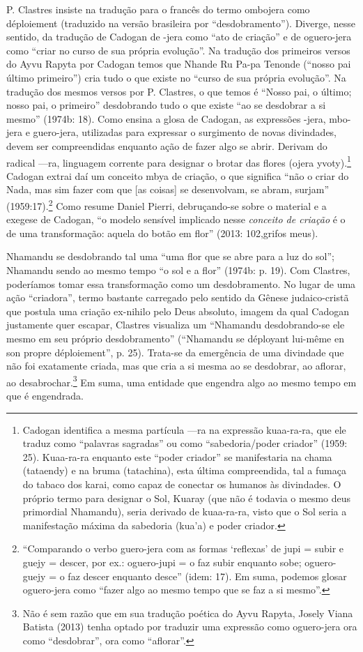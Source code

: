 P. Clastres insiste na tradução para o francês do termo ombojera como
déploiement (traduzido na versão brasileira por ``desdobramento'').
Diverge, nesse sentido, da tradução de Cadogan de -jera como ``ato de
criação'' e de oguero-jera como ``criar no curso de sua própria
evolução''. Na tradução dos primeiros versos do Ayvu Rapyta por Cadogan
temos que Nhande Ru Pa-pa Tenonde (``nosso pai último primeiro'') cria
tudo o que existe no ``curso de sua própria evolução''. Na tradução dos
mesmos versos por P. Clastres, o que temos é ``Nosso pai, o último;
nosso pai, o primeiro'' desdobrando tudo o que existe ``ao se desdobrar a
si mesmo'' (1974b: 18). Como ensina a glosa de Cadogan, as expressões
-jera, mbo-jera e guero-jera, utilizadas para expressar o surgimento de
novas divindades, devem ser compreendidas enquanto ação de fazer algo
se abrir. Derivam do radical —ra, linguagem corrente para designar o
brotar das flores (ojera yvoty).\footnote{Cadogan identifica a mesma
partícula —ra na expressão kuaa-ra-ra, que ele traduz como ``palavras
sagradas'' ou como ``sabedoria/poder criador'' (1959: 25). Kuaa-ra-ra
enquanto este ``poder criador'' se manifestaria na chama (tataendy) e na
bruma (tatachina), esta última compreendida, tal a fumaça do tabaco dos
karai, como capaz de conectar os humanos às divindades. O próprio termo
para designar o Sol, Kuaray (que não é todavia o mesmo deus primordial
Nhamandu), seria derivado de kuaa-ra-ra, visto que o Sol seria a
manifestação máxima da sabedoria (kua’a) e poder criador.  } Cadogan
extrai daí um conceito mbya de criação, o que significa ``não o criar do
Nada, mas sim fazer com que [as coisas] se desenvolvam, se abram,
surjam'' (1959:17).\footnote{``Comparando o verbo guero-jera com as
formas ‘reflexas’ de jupi = subir e guejy = descer, por ex.:
oguero-jupi = o faz subir enquanto sobe; oguero-guejy = o faz descer
enquanto desce'' (idem: 17). Em suma, podemos glosar oguero-jera como
``fazer algo ao mesmo tempo que se faz a si mesmo''.} Como resume Daniel
Pierri, debruçando-se sobre o material e a exegese de Cadogan, ``o
modelo sensível implicado nesse \emph{conceito de criação} é o de uma
transformação: aquela do botão em flor'' (2013: 102,grifos meus). 

Nhamandu se desdobrando tal uma ``uma flor que se abre para a luz do
sol''; Nhamandu sendo ao mesmo tempo ``o sol e a flor'' (1974b: p. 19).
Com Clastres, poderíamos tomar essa transformação como um
desdobramento. No lugar de uma ação ``criadora'', termo bastante
carregado pelo sentido da Gênese judaico-cristã que postula uma criação
ex-nihilo pelo Deus absoluto, imagem da qual Cadogan justamente quer
escapar, Clastres visualiza um ``Nhamandu desdobrando-se ele mesmo em
seu próprio desdobramento'' (``Nhamandu se déployant lui-même en son
propre déploiement'', p. 25). Trata-se da emergência de uma divindade
que não foi exatamente criada, mas que cria a si mesma ao se desdobrar,
ao aflorar, ao desabrochar.\footnote{Não é sem razão que em sua
tradução poética do Ayvu Rapyta, Josely Viana Batista (2013) tenha
optado por traduzir uma expressão como oguero-jera ora como
``desdobrar'', ora como ``aflorar''.}  Em suma, uma entidade que engendra
algo ao mesmo tempo em que é engendrada.

